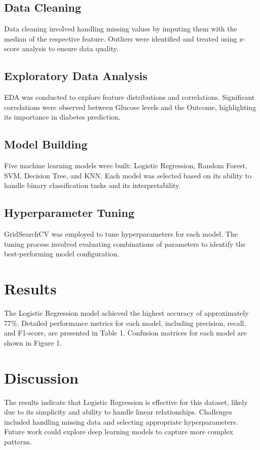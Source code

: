 \documentclass[conference]{IEEEtran}
\begin{document}
\subsection{Data Cleaning}
Data cleaning involved handling missing values by imputing them with the median of the respective feature. Outliers were identified and treated using z-score analysis to ensure data quality.
\subsection{Exploratory Data Analysis}
EDA was conducted to explore feature distributions and correlations. Significant correlations were observed between Glucose levels and the Outcome, highlighting its importance in diabetes prediction.
\subsection{Model Building}
Five machine learning models were built: Logistic Regression, Random Forest, SVM, Decision Tree, and KNN. Each model was selected based on its ability to handle binary classification tasks and its interpretability.
\subsection{Hyperparameter Tuning}
GridSearchCV was employed to tune hyperparameters for each model. The tuning process involved evaluating combinations of parameters to identify the best-performing model configuration.

\section{Results}
The Logistic Regression model achieved the highest accuracy of approximately 77\%. Detailed performance metrics for each model, including precision, recall, and F1-score, are presented in Table 1. Confusion matrices for each model are shown in Figure 1.

\section{Discussion}
The results indicate that Logistic Regression is effective for this dataset, likely due to its simplicity and ability to handle linear relationships. Challenges included handling missing data and selecting appropriate hyperparameters. Future work could explore deep learning models to capture more complex patterns.
\end{document}

